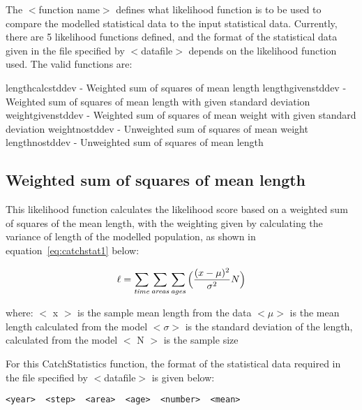 \documentclass [a4paper, 10pt]{book}
\begin{document}
\bigskip
The $<$function name$>$ defines what likelihood function is to be used to compare the modelled statistical data to the input statistical data.  Currently, there are 5 likelihood functions defined, and the format of the statistical data given in the file specified by $<$datafile$>$ depends on the likelihood function used.  The valid functions are:

\bigskip
lengthcalcstddev - Weighted sum of squares of mean length\newline
lengthgivenstddev - Weighted sum of squares of mean length with given standard deviation\newline
weightgivenstddev - Weighted sum of squares of mean weight with given standard deviation\newline
weightnostddev - Unweighted sum of squares of mean weight\newline
lengthnostddev - Unweighted sum of squares of mean length

\subsection{Weighted sum of squares of mean length}
This likelihood function calculates the likelihood score based on a weighted sum of squares of the mean length, with the weighting given by calculating the variance of length of the modelled population, as shown in equation~\ref{eq:catchstat1} below:

\begin{equation}\label{eq:catchstat1}
\ell = \sum_{\it time}\sum_{\it areas}\sum_{\it ages} \Big(\frac{(x-\mu)^2} {\sigma^2} N\Big)
\end{equation}

where:\newline
$<$ x $>$ is the sample mean length from the data\newline
$<\mu>$ is the mean length calculated from the model\newline
$<\sigma>$ is the standard deviation of the length, calculated from the model\newline
$<$ N $>$ is the sample size

\bigskip
For this CatchStatistics function, the format of the statistical data required in the file specified by $<$datafile$>$ is given below:

{\small\begin{verbatim}
<year>  <step>  <area>  <age>  <number>  <mean>
\end{verbatim}}
\end{document}
